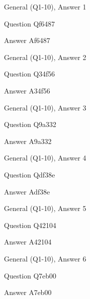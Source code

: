 \documentclass[11pt]{beamer}
\begin{document}
\begin{frame}[t]{General (Q1-10), Answer 1}
\vspace{2em}
\begin{block}{Question}
Qf6487
\end{block}
\pause{}
\begin{block}{Answer}
Af6487
\end{block}
\end{frame}
    

\begin{frame}[t]{General (Q1-10), Answer 2}
\vspace{2em}
\begin{block}{Question}
Q34f56
\end{block}
\pause{}
\begin{block}{Answer}
A34f56
\end{block}
\end{frame}
    

\begin{frame}[t]{General (Q1-10), Answer 3}
\vspace{2em}
\begin{block}{Question}
Q9a332
\end{block}
\pause{}
\begin{block}{Answer}
A9a332
\end{block}
\end{frame}
    

\begin{frame}[t]{General (Q1-10), Answer 4}
\vspace{2em}
\begin{block}{Question}
Qdf38e
\end{block}
\pause{}
\begin{block}{Answer}
Adf38e
\end{block}
\end{frame}
    

\begin{frame}[t]{General (Q1-10), Answer 5}
\vspace{2em}
\begin{block}{Question}
Q42104
\end{block}
\pause{}
\begin{block}{Answer}
A42104
\end{block}
\end{frame}
    

\begin{frame}[t]{General (Q1-10), Answer 6}
\vspace{2em}
\begin{block}{Question}
Q7eb00
\end{block}
\pause{}
\begin{block}{Answer}
A7eb00
\end{block}
\end{frame}
    
\end{document}
